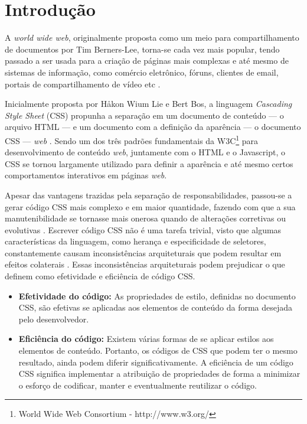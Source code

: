 \chapter{Introdução}
\label{chap:Intr}
A \textit{world wide web}, originalmente proposta como um meio para compartilhamento de documentos por Tim Berners-Lee, torna-se cada vez mais popular, tendo passado a ser usada para a criação de páginas mais complexas e até mesmo de sistemas de informação, como comércio eletrônico, fóruns, clientes de email, portais de compartilhamento de vídeo etc \cite{Berners-Lee:2000:WWO:556560}.

Inicialmente proposta por Håkon Wium Lie e Bert Bos, a linguagem \textit{Cascading Style Sheet} (CSS) propunha a separação em um documento de conteúdo --- o arquivo HTML --- e um documento com a definição da aparência --- o documento CSS --- \textit{web} \cite{Hakon:2005}. Sendo um dos três padrões fundamentais da W3C\footnote{World Wide Web Consortium - http://www.w3.org/} para desenvolvimento de conteúdo \textit{web}, juntamente com o HTML e o Javascript, o CSS se tornou largamente utilizado para definir a aparência e até mesmo certos comportamentos interativos em páginas \textit{web}. 

Apesar das vantagens trazidas pela separação de responsabilidades, passou-se a gerar código CSS mais complexo e em maior quantidade, fazendo com que a sua manutenibilidade se tornasse mais onerosa quando de alterações corretivas ou evolutivas \cite{Mesbah2012}.
Escrever código CSS não é uma tarefa trivial, visto que algumas características da linguagem, como herança e especificidade de seletores, constantemente causam inconsistências arquiteturais que podem resultar em efeitos colaterais \cite{Walton:2015}.
Essas inconsistências arquiteturais podem prejudicar o que  definem como efetividade e eficiência de código CSS.

\begin{itemize}
	\item\textbf{Efetividade do código:} As propriedades de estilo, definidas no documento CSS, são efetivas se aplicadas aos elementos de conteúdo da forma desejada pelo desenvolvedor.
	
	\item\textbf{Eficiência do código:} Existem várias formas de se aplicar estilos aos elementos de conteúdo. Portanto, os códigos de CSS que podem ter o mesmo resultado, ainda podem diferir significativamente. A eficiência de um código CSS significa implementar a atribuição de propriedades de forma a minimizar o esforço de codificar, manter e eventualmente reutilizar o código.
\end{itemize}

